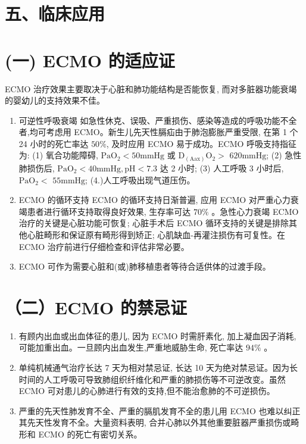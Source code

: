 \documentclass[10pt]{article}
\begin{document}
\section*{五、临床应用}
\section*{(一) ECMO 的适应证}
ECMO 治疗效果主要取决于心脏和肺功能结构是否能恢复, 而对多脏器功能衰竭的婴幼儿的支持效果不佳。

\begin{enumerate}
  \item 可逆性呼吸衰竭 如急性休克、误吸、严重损伤、感染等造成的呼吸功能不全者,均可考虑用 ECMO。新生儿先天性膈疝由于肺泡膨胀严重受限, 在第 1 个 24 小时的死亡率达 $50 \%$, 及时应用 ECMO 易于成功。ECMO 呼吸支持指征为: (1) 氧合功能障碍, $\mathrm{PaO}_{2}<50 \mathrm{mmHg}$ 或 $\mathrm{D}_{(\mathrm{Aax})} \mathrm{O}_{2}>$ $620 \mathrm{mmHg}$; (2) 急性肺损伤后, $\mathrm{PaO}_{2}<40 \mathrm{mmHg}, \mathrm{pH}<7.3$ 达 2 小时; (3) 人工呼吸 3 小时后, $\mathrm{PaO}_{2}<$ $55 \mathrm{mmHg}$; (4.)人工呼吸出现气道压伤。

  \item ECMO 的循环支持 ECMO 的循环支持日渐普遍, 应用 ECMO 对严重心力衰竭患者进行循环支持取得良好效果, 生存率可达 $70 \%$ 。急性心力衰竭 ECMO 治疗的关键是心脏功能可恢复; 心脏手术后 ECMO 循环支持的关键是排除其他心脏畸形和保证原有畸形得到矫正; 心肌缺血-再灌注损伤有可复性。在 ECMO 治疗前进行仔细检查和评估非常必要。

  \item ECMO 可作为需要心脏和(或)肺移植患者等待合适供体的过渡手段。

\end{enumerate}

\section*{（二）ECMO 的禁忌证}
\begin{enumerate}
  \item 有顾内出血或出血体征的患儿, 因为 ECMO 时需肝素化, 加上凝血因子消耗, 可能加重出血。一旦顾内出血发生,严重地威胁生命, 死亡率达 $94 \%$ 。

  \item 单纯机械通气治疗长达 7 天为相对禁忌证, 长达 10 天为绝对禁忌证。因为长时间的人工呼吸可导致肺组织纤维化和严重的肺损伤等不可逆改变。虽然 ECMO 可对患儿的心肺进行有效的支持,但不能治愈肺的不可逆损伤。

  \item 严重的先天性肺发育不全、严重的膈肌发育不全的患儿用 ECMO 也难以纠正其先天性发育不全。大量资料表明, 合并心肺以外其他重要脏器严重损伤或畸形和 ECMO 的死亡有密切关系。

\end{enumerate}
\end{document}
